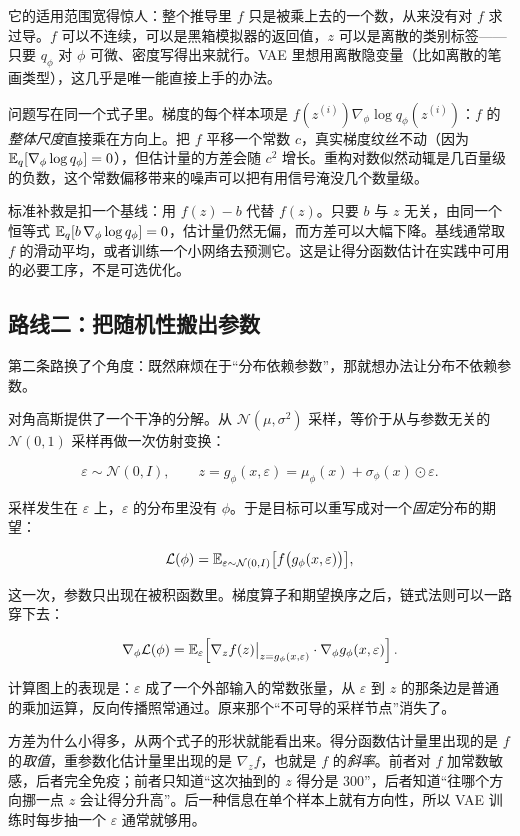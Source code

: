 它的适用范围宽得惊人：整个推导里 \(f\) 只是被乘上去的一个数，从来没有对 \(f\) 求过导。\(f\) 可以不连续，可以是黑箱模拟器的返回值，\(z\) 可以是离散的类别标签——只要 \(q_\phi\) 对 \(\phi\) 可微、密度写得出来就行。VAE 里想用离散隐变量（比如离散的笔画类型），这几乎是唯一能直接上手的办法。

问题写在同一个式子里。梯度的每个样本项是 \(f(z^{(i)})\nabla_\phi\log q_\phi(z^{(i)})\)：\(f\) 的\emph{整体尺度}直接乘在方向上。把 \(f\) 平移一个常数 \(c\)，真实梯度纹丝不动（因为 \(\mathbb{E}_q[\nabla_\phi\log q_\phi]=0\)），但估计量的方差会随 \(c^2\) 增长。重构对数似然动辄是几百量级的负数，这个常数偏移带来的噪声可以把有用信号淹没几个数量级。

标准补救是扣一个基线：用 \(f(z)-b\) 代替 \(f(z)\)。只要 \(b\) 与 \(z\) 无关，由同一个恒等式 \(\mathbb{E}_q[b\,\nabla_\phi\log q_\phi]=0\)，估计量仍然无偏，而方差可以大幅下降。基线通常取 \(f\) 的滑动平均，或者训练一个小网络去预测它。这是让得分函数估计在实践中可用的必要工序，不是可选优化。

\subsection{路线二：把随机性搬出参数}

第二条路换了个角度：既然麻烦在于``分布依赖参数''，那就想办法让分布不依赖参数。

对角高斯提供了一个干净的分解。从 \(\mathcal N(\mu,\sigma^2)\) 采样，等价于从与参数无关的 \(\mathcal N(0,1)\) 采样再做一次仿射变换：

\[
\varepsilon \sim \mathcal N(0,I),
\qquad
z = g_\phi(x,\varepsilon) = \mu_\phi(x) + \sigma_\phi(x)\odot\varepsilon .
\]

采样发生在 \(\varepsilon\) 上，\(\varepsilon\) 的分布里没有 \(\phi\)。于是目标可以重写成对一个\emph{固定}分布的期望：

\[
\mathcal L(\phi) = \mathbb{E}_{\varepsilon\sim \mathcal N(0,I)}\big[f\big(g_\phi(x,\varepsilon)\big)\big],
\]

这一次，参数只出现在被积函数里。梯度算子和期望换序之后，链式法则可以一路穿下去：

\[
\nabla_\phi \mathcal L(\phi)
= \mathbb{E}_{\varepsilon}\!\left[\nabla_z f(z)\big|_{z=g_\phi(x,\varepsilon)}\cdot \nabla_\phi g_\phi(x,\varepsilon)\right].
\]

计算图上的表现是：\(\varepsilon\) 成了一个外部输入的常数张量，从 \(\varepsilon\) 到 \(z\) 的那条边是普通的乘加运算，反向传播照常通过。原来那个``不可导的采样节点''消失了。

方差为什么小得多，从两个式子的形状就能看出来。得分函数估计量里出现的是 \(f\) 的\emph{取值}，重参数化估计量里出现的是 \(\nabla_z f\)，也就是 \(f\) 的\emph{斜率}。前者对 \(f\) 加常数敏感，后者完全免疫；前者只知道``这次抽到的 \(z\) 得分是 300''，后者知道``往哪个方向挪一点 \(z\) 会让得分升高''。后一种信息在单个样本上就有方向性，所以 VAE 训练时每步抽一个 \(\varepsilon\) 通常就够用。

